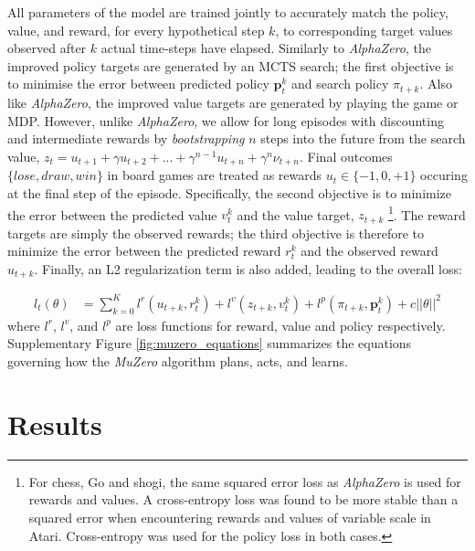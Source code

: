 \documentclass{article}
\newcommand{\muzero}{\emph{MuZero}}
\newcommand{\alphazero}{\emph{AlphaZero}}
\begin{document}
All parameters of the model are trained jointly to accurately match the policy, value, and reward, for every hypothetical step $k$, to corresponding target values observed after $k$ actual time-steps have elapsed. Similarly to \alphazero{}, the improved policy targets are generated by an MCTS search; the first objective is to minimise the error between predicted policy $\mathbf{p}_t^k$ and search policy $\pi_{t+k}$. Also like \alphazero{}, the improved value targets are generated by playing the game or MDP. However, unlike \alphazero{}, we allow for long episodes with discounting and intermediate rewards by \emph{bootstrapping} $n$ steps into the future from the search value, $z_t = u_{t+1} + \gamma u_{t+2} + ... + \gamma^{n-1} u_{t+n} + \gamma^n \nu_{t+n}$. Final outcomes $\{lose, draw, win\}$ in board games are treated as rewards $u_t \in \{ -1, 0, +1 \}$ occuring at the final step of the episode. Specifically, the second objective is to minimize the error between the predicted value $v^k_t$ and the value target, $z_{t+k}$ \footnote{For chess, Go and shogi, the same squared error loss as \alphazero{} is used for rewards and values. A cross-entropy loss was found to be more stable than a squared error when encountering rewards and values of variable scale in Atari. Cross-entropy was used for the policy loss in both cases.}. The reward targets are simply the observed rewards; the third objective is therefore to minimize the error between the predicted reward $r^k_t$ and the observed reward $u_{t+k}$. Finally, an L2 regularization term is also added, leading to the overall loss:

\begin{align}
l_t(\theta) &= \sum_{k=0}^K l^r (u_{t+k}, r_t^k) + l^v(z_{t+k}, v^k_t) + l^p(\pi_{t+k}, \mathbf{p}^k_t) + c ||\theta||^2
\label{muzero_eqn}
\end{align}
%
where $l^r$, $l^v$, and $l^p$ are loss functions for reward, value and policy respectively.
Supplementary Figure \ref{fig:muzero_equations} summarizes the equations governing how the \muzero{} algorithm plans, acts, and learns.

\section{Results}
\end{document}
